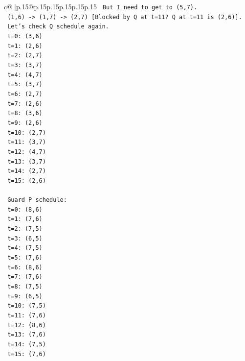\documentclass{article}
\begin{document}
{\begin{supertabular}{c@{$\;$}|p{.15\linewidth}@{}p{.15\linewidth}p{.15\linewidth}p{.15\linewidth}p{.15\linewidth}p{.15\linewidth}}
{{{\texttt{    But I need to get to (5,7).} \\
\texttt{    (1,6) {-}> (1,7) {-}> (2,7) {[}Blocked by Q at t=11? Q at t=11 is (2,6){]}.} \\
\texttt{    Let's check Q schedule again.} \\
\texttt{    t=0: (3,6)} \\
\texttt{    t=1: (2,6)} \\
\texttt{    t=2: (2,7)} \\
\texttt{    t=3: (3,7)} \\
\texttt{    t=4: (4,7)} \\
\texttt{    t=5: (3,7)} \\
\texttt{    t=6: (2,7)} \\
\texttt{    t=7: (2,6)} \\
\texttt{    t=8: (3,6)} \\
\texttt{    t=9: (2,6)} \\
\texttt{    t=10: (2,7)} \\
\texttt{    t=11: (3,7)} \\
\texttt{    t=12: (4,7)} \\
\texttt{    t=13: (3,7)} \\
\texttt{    t=14: (2,7)} \\
\texttt{    t=15: (2,6)} \\
\\ 
\texttt{    Guard P schedule:} \\
\texttt{    t=0: (8,6)} \\
\texttt{    t=1: (7,6)} \\
\texttt{    t=2: (7,5)} \\
\texttt{    t=3: (6,5)} \\
\texttt{    t=4: (7,5)} \\
\texttt{    t=5: (7,6)} \\
\texttt{    t=6: (8,6)} \\
\texttt{    t=7: (7,6)} \\
\texttt{    t=8: (7,5)} \\
\texttt{    t=9: (6,5)} \\
\texttt{    t=10: (7,5)} \\
\texttt{    t=11: (7,6)} \\
\texttt{    t=12: (8,6)} \\
\texttt{    t=13: (7,6)} \\
\texttt{    t=14: (7,5)} \\
\texttt{    t=15: (7,6)} \\
\\ 
}}}
\end{supertabular}}
\end{document}
